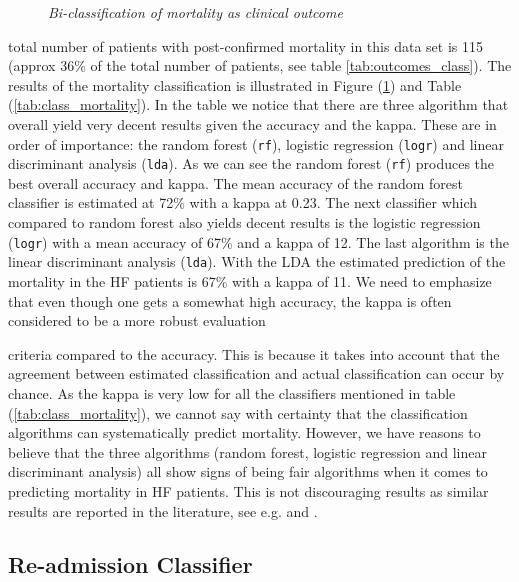 \documentclass[../thesis.tex]{subfiles}
\begin{document}
\begin{figure}[h!]
    \centering
    \scalebox{.8}{}
    \caption[Bi-classification of mortality as clinical outcome]{\textit{Bi-classification of mortality as clinical outcome}}
    \label{fig:bi_class_mort}
\end{figure}
\newpage
\noindent total number of patients with post-confirmed mortality in this data set is 115 (approx 36\% of the total number of patients, see table \ref{tab:outcomes_class}). The results of the mortality classification is illustrated in Figure (\ref{fig:bi_class_mort}) and Table (\ref{tab:class_mortality}). In the table we notice that there are three algorithm that overall yield very decent results given the accuracy and the kappa. These are in order of importance: the random forest (\texttt{rf}), logistic regression (\texttt{logr}) and linear discriminant analysis (\texttt{lda}). As we can see the random forest (\texttt{rf}) \citep{ho1995random} produces the best overall accuracy and kappa. The mean accuracy of the random forest classifier is estimated at 72\% with a kappa at 0.23. The next classifier which compared to random forest also yields decent results is the logistic regression (\texttt{logr}) with a mean accuracy of 67\% and a kappa of 12. The last algorithm is the linear discriminant analysis (\texttt{lda}). With the LDA the estimated prediction of the mortality in the HF patients is 67\% with a kappa of 11. We need to emphasize that even though one gets a somewhat high accuracy, the kappa is often considered to be a more robust evaluation 



\noindent  criteria compared to the accuracy. This is because it takes into account that the agreement between estimated classification and actual classification can occur by chance. As the kappa is very low for all the classifiers mentioned in table (\ref{tab:class_mortality}), we cannot say with certainty that the classification algorithms can systematically predict mortality. However, we have reasons to believe that the three algorithms (random forest, logistic regression and linear discriminant analysis) all show signs of being fair algorithms when it comes to predicting mortality in HF patients. This is not discouraging results as similar results are reported in the literature, see e.g. \cite{shah2014phenomapping} and \cite{panahiazar2015using}.

\subsection{Re-admission Classifier}
\end{document}
